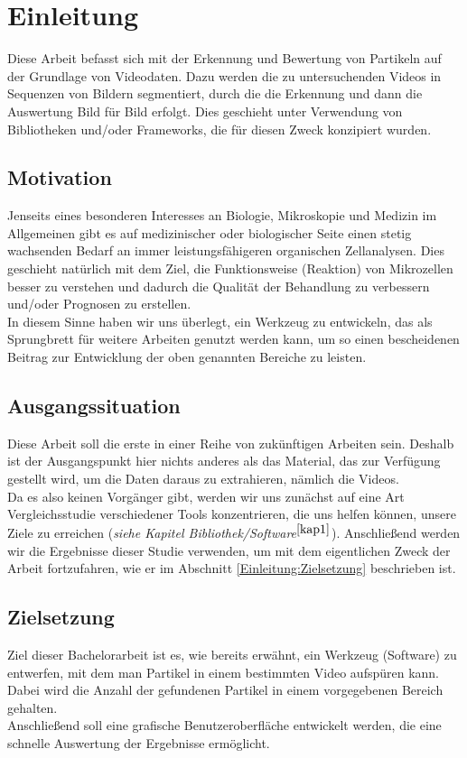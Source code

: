 \chapter{Einleitung \label{Einleitung}}
Diese Arbeit befasst sich mit der Erkennung und Bewertung von Partikeln auf der Grundlage von Videodaten. Dazu werden die zu untersuchenden Videos in Sequenzen von Bildern segmentiert, durch die die Erkennung und dann die Auswertung Bild für Bild erfolgt. Dies geschieht unter Verwendung von Bibliotheken und/oder Frameworks, die für diesen Zweck konzipiert wurden.

\section{Motivation \label{Einleitung:Motivation}}
Jenseits eines besonderen Interesses an Biologie, Mikroskopie und Medizin im Allgemeinen gibt es auf medizinischer oder biologischer Seite einen stetig wachsenden Bedarf an immer leistungsfähigeren organischen Zellanalysen. Dies geschieht natürlich mit dem Ziel, die Funktionsweise (Reaktion) von Mikrozellen besser zu verstehen und dadurch die Qualität der Behandlung zu verbessern und/oder Prognosen zu erstellen.\\
In diesem Sinne haben wir uns überlegt, ein Werkzeug zu entwickeln, das als Sprungbrett für weitere Arbeiten genutzt werden kann, um so einen bescheidenen Beitrag zur Entwicklung der oben genannten Bereiche zu leisten.

\section{Ausgangssituation \label{Einleitung:Ausgangssituation}}
Diese Arbeit soll die erste in einer Reihe von zukünftigen Arbeiten sein. Deshalb ist der Ausgangspunkt hier nichts anderes als das Material, das zur Verfügung gestellt wird, um die Daten daraus zu extrahieren, nämlich die Videos.\\
Da es also keinen Vorgänger gibt, werden wir uns zunächst auf eine Art Vergleichsstudie verschiedener Tools konzentrieren, die uns helfen können, unsere Ziele zu erreichen (\textit{siehe Kapitel Bibliothek/Software}$^{\ref{kap1}}$). Anschließend werden wir die Ergebnisse dieser Studie verwenden, um mit dem eigentlichen Zweck der Arbeit fortzufahren, wie er im Abschnitt \ref{Einleitung:Zielsetzung} beschrieben ist.

\section{Zielsetzung \label{Einleitung:Zielsetzung}}
Ziel dieser Bachelorarbeit ist es, wie bereits erwähnt, ein Werkzeug (Software) zu entwerfen, mit dem man Partikel in einem bestimmten Video aufspüren kann. Dabei wird die Anzahl der gefundenen Partikel in einem vorgegebenen Bereich gehalten.\\
Anschließend soll eine grafische Benutzeroberfläche entwickelt werden, die eine schnelle Auswertung der Ergebnisse ermöglicht.


